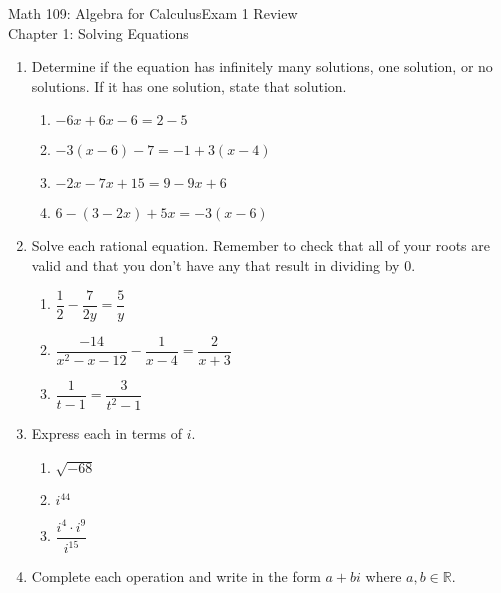 \documentclass[12pt]{article}
\begin{document}
	\noindent Math 109: Algebra for Calculus\hfill Exam 1 Review\\
	\mbox{}\hfill Chapter 1: Solving Equations
	\setcounter{page}{1}
	\fancyfoot[C]{\thepage}
\begin{enumerate}
		\item Determine if the equation has infinitely many solutions, one solution, or no solutions. If it has one solution, state that solution.
			\begin{multicols}{2}
				\begin{enumerate}
					\item $-6x+6x-6=2-5$
						\vskip 1in
					\item $-3(x-6)-7=-1+3(x-4)$
						\vskip 1in
					\item $-2x-7x+15=9-9x+6$
						\vskip 1in
					\item $6-(3-2x)+5x=-3(x-6)$
						\vskip 1in
				\end{enumerate}
			\end{multicols}
		\vskip 1in
		\item Solve each rational equation. Remember to check that all of your roots are valid and that you don't have any that result in dividing by 0.
			\begin{multicols}{2}
				\begin{enumerate}
					\item $\dfrac{1}{2}-\dfrac{7}{2y}=\dfrac{5}{y}$
						\vskip 1.5in
					\item $\dfrac{-14}{x^2-x-12}-\dfrac{1}{x-4}=\dfrac{2}{x+3}$
						\vskip 2in
					\item $\dfrac{1}{t-1}=\dfrac{3}{t^2-1}$
						\vskip 2in
				\end{enumerate}
			\end{multicols}
			\vfill
		\item Express each in terms of $i$.
			\begin{multicols}{3}
				\begin{enumerate}
					\item $\sqrt{-68}$
					\item $i^{44}$
					\item $\dfrac{i^4\cdot i^9}{i^{15}}$
				\end{enumerate}
			\end{multicols}
	\newpage
		\item Complete each operation and write in the form $a+bi$ where $a,b\in\mathbb{R}$.
		\begin{multicols}{2}
			\begin{enumerate}

\end{enumerate}
\end{multicols}
\end{enumerate}
\end{document}
